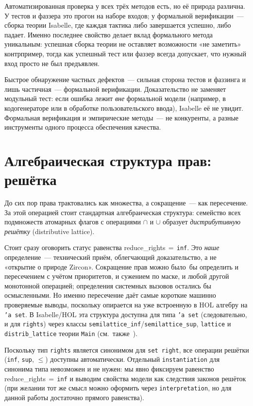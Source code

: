 \documentclass[11pt,a4paper]{article}
\newcommand{\isabel}[1]{{\isabelleit #1}}
\newcommand{\lemmaname}[1]{\isabel{#1}}
\begin{document}
Автоматизированная проверка у всех трёх методов есть, но её природа
различна. У тестов и фаззера это прогон на наборе входов; у
формальной верификации~--- сборка теории Isabelle, где каждая тактика
либо завершается успешно, либо падает. Именно последнее свойство
делает вклад формального метода уникальным: успешная сборка теории не
оставляет возможности «не заметить» контрпример, тогда как успешный
тест или фаззер всегда допускает, что нужный вход просто не был
предъявлен.

Быстрое обнаружение частных дефектов~--- сильная сторона тестов и
фаззинга и лишь частичная~--- формальной верификации. Доказательство
не заменяет модульный тест: если ошибка лежит \emph{вне} формальной
модели (например, в кодогенераторе или в обработке пользовательского
ввода), Isabelle её не увидит. Формальная верификация и эмпирические
методы~--- не конкуренты, а разные инструменты одного процесса
обеспечения качества.

\section{Алгебраическая структура прав: решётка}

До сих пор права трактовались как множества, а сокращение~--- как
пересечение. За этой операцией стоит стандартная алгебраическая
структура: семейство всех подмножеств атомарных флагов с операциями
$\cap$ и $\cup$ образует \emph{дистрибутивную решётку}
(distributive lattice).

Стоит сразу оговорить статус равенства
\lemmaname{reduce\_rights}\,$=\,$\texttt{inf}. Это \emph{наше}
определение~--- технический приём, облегчающий доказательство, а не
«открытие о природе Zircon». Сокращение прав можно было~бы определить
и пересечением с учётом приоритетов, и сужением по маске, и любой
другой монотонной операцией; определения системных вызовов остались
бы осмысленными. Но именно пересечение даёт самые короткие
машинно проверяемые выводы, поскольку опирается на уже встроенную в
HOL алгебру на \texttt{'a~set}. В Isabelle/HOL эта структура доступна для
типа \texttt{'a~set} (следовательно, и для \texttt{rights}) через
классы \texttt{semilattice\_inf}/\texttt{semilattice\_sup}, \texttt{lattice} и
\texttt{distrib\_lattice} теории \texttt{Main}
(см.~также~\cite{nipkowklein,isabelle}).

Поскольку тип \texttt{rights} является синонимом для \texttt{set~right},
все операции решётки (\texttt{inf}, \texttt{sup}, $\le$) доступны
автоматически. Отдельный \texttt{instantiation} для синонима типа
невозможен и не нужен: мы явно фиксируем равенство
\lemmaname{reduce\_rights}\,$=\,$\texttt{inf} и выводим свойства модели
как следствия законов решёток (при желании тот же смысл можно оформить
через \texttt{interpretation}, но для данной работы достаточно прямого
равенства).
\end{document}
